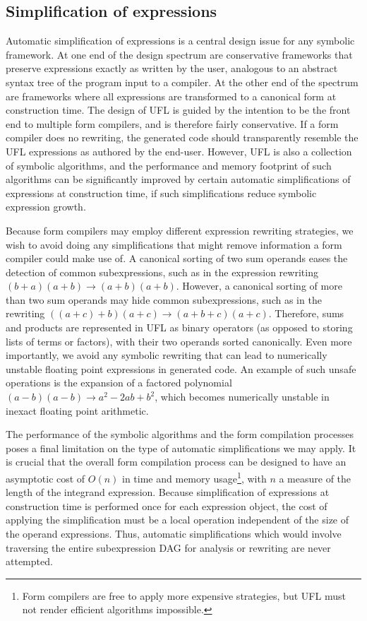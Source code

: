 \documentclass[prodmode,acmtoms]{acmsmall}
\begin{document}
\subsection{Simplification of expressions}

Automatic simplification of expressions is a central design issue for any
symbolic framework. At one end of the design spectrum are conservative
frameworks that preserve expressions exactly as written by the user,
analogous to an abstract syntax tree of the program input to a
compiler. At the other end of the spectrum are frameworks where all
expressions are transformed to a canonical form at construction time.
The design of UFL is guided by the intention to be the front end to
multiple form compilers, and is therefore fairly conservative. If a form
compiler does no rewriting, the generated code should transparently
resemble the UFL expressions as authored by the end-user.  However,
UFL is also a collection of symbolic algorithms, and the performance
and memory footprint of such algorithms can be significantly improved by
certain automatic simplifications of expressions at construction time,
if such simplifications reduce symbolic expression growth.

Because form compilers may employ different expression rewriting
strategies, we wish to avoid doing any simplifications that might remove
information a form compiler could make use of.  A canonical sorting of
two sum operands eases the detection of common subexpressions, such as
in the expression rewriting $(b + a)(a + b) \rightarrow (a + b)(a +
b)$.  However, a canonical sorting of more than two sum operands may
hide common subexpressions, such as in the rewriting $((a + c) + b)(a
+ c) \rightarrow (a + b + c)(a + c)$.  Therefore, sums and products
are represented in UFL as binary operators (as opposed to storing
lists of terms or factors), with their two operands sorted
canonically.  Even more importantly, we avoid any symbolic rewriting
that can lead to numerically unstable floating point expressions in
generated code.  An example of such unsafe operations is the expansion
of a factored polynomial $(a - b)(a - b) \rightarrow a^2 - 2ab + b^2$,
which becomes numerically unstable in inexact floating point
arithmetic.

The performance of the symbolic algorithms and the form compilation
processes poses a final limitation on the type of automatic
simplifications we may apply. It is crucial that the overall form
compilation process can be designed to have an asymptotic cost of $O(n)$
in time and memory usage\footnote{Form compilers are free to
  apply more expensive strategies, but UFL must not render efficient
  algorithms impossible.}, with $n$ a measure of the length of the
integrand expression. Because simplification of expressions at
construction time is performed once for each expression object, the cost
of applying the simplification must be a local operation independent
of the size of the operand expressions. Thus, automatic simplifications
which would involve traversing the entire subexpression DAG for analysis
or rewriting are never attempted.
\end{document}
